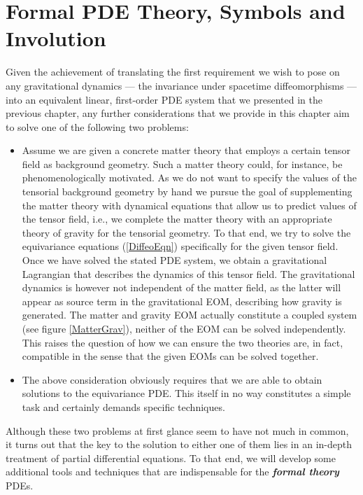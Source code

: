 \section{Formal PDE Theory, Symbols and Involution}
Given the achievement of translating the first requirement we wish to pose on any gravitational dynamics --- the invariance under spacetime diffeomorphisms --- into an equivalent linear, first-order PDE system that we presented in the previous chapter, any further considerations that we provide in this chapter aim to solve one of the following two problems:
\begin{itemize}
    \item Assume we are given a concrete matter theory that employs a certain tensor field as background geometry.
    Such a matter theory could, for instance, be phenomenologically motivated. As we do not want to specify the values of the tensorial background geometry by hand we pursue the goal of supplementing the matter theory with dynamical equations that allow us to predict values of the tensor field, i.e., we complete the matter theory with an appropriate theory of gravity for the tensorial geometry. To that end, we try to solve the equivariance equations (\ref{DiffeoEqn}) specifically for the given tensor field. 
    Once we have solved the stated PDE system, we obtain a gravitational Lagrangian that describes the dynamics of this tensor field. The gravitational dynamics is however not independent of the matter field, as the latter will appear as source term in the gravitational EOM, describing how gravity is generated.
    The matter and gravity EOM actually constitute a coupled system (see figure \ref{MatterGrav}), neither of the EOM can be solved independently. This raises the question of how we can ensure the two theories are, in fact, compatible in the sense that the given EOMs can be solved together.
    \item The above consideration obviously requires that we are able to obtain solutions to the equivariance PDE. This itself in no way constitutes a simple task and certainly demands specific techniques.
\end{itemize}
Although these two problems at first glance seem to have not much in common, it turns out that the key to the solution to either one of them lies in an in-depth treatment of partial differential equations. 
To that end, we will develop some additional tools and techniques that are indispensable for the  \textit{\textbf{formal theory}} PDEs.

